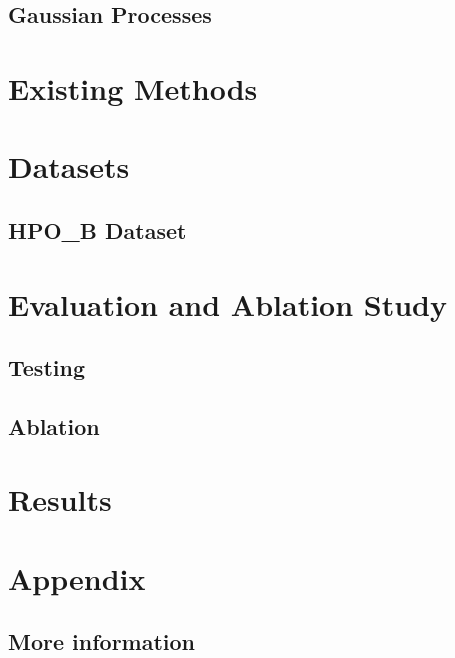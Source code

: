 \documentclass[11pt]{article}
\begin{document}
\subsection{Gaussian Processes}

\section{Existing Methods}

\section{Datasets}
\subsection{HPO\_B Dataset}

\section{Evaluation and Ablation Study}
\subsection{Testing}
\subsection{Ablation}

\section{Results}




\section{Appendix}
\subsection{More information}
\end{document}
